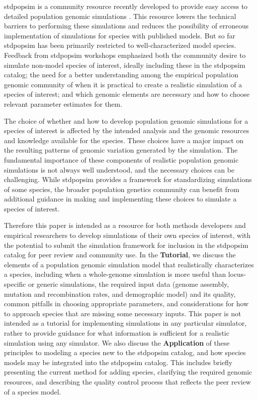 \documentclass[hidelinks]{article}
\begin{document}
stdpopsim is a community resource recently developed to provide easy
access to detailed population genomic simulations \citep{Adrion2020}. This
resource lowers the technical barriers to performing these simulations
and reduces the possibility of erroneous implementation of simulations
for species with published models. But so far stdpopsim has been
primarily restricted to well-characterized model species. Feedback from
stdpopsim workshops emphasized both the community desire to simulate
non-model species of interest, ideally including these in the stdpopsim catalog;
the need for a better understanding among the empirical population
genomic community of when it is practical to create a realistic
simulation of a species of interest; and which genomic elements are
necessary and how to choose relevant parameter estimates for them.

The choice of whether and how to develop population genomic
simulations for a species of interest is affected by the intended
analysis and the genomic resources and knowledge available for the
species. These choices have a major impact on the resulting patterns of
genomic variation generated by the simulation. The fundamental
importance of these components of realistic population genomic
simulations is not always well understood, and the necessary choices can
be challenging. While stdpopsim provides a framework for standardizing
simulations of some species, the broader population genetics community
can benefit from additional guidance in making and implementing these
choices to simulate a species of interest.

Therefore this paper is intended as a resource for both methods
developers and empirical researchers to develop simulations of their own
species of interest, with the potential to submit the simulation
framework for inclusion in the stdpopsim catalog for peer review and
community use. In the \textbf{Tutorial}, we discuss the elements of a
population genomic simulation model that realistically characterizes a
species, including when a whole-genome simulation is more useful than
locus-specific or generic simulations, the required input data (genome
assembly, mutation and recombination rates, and demographic model) and
its quality, common pitfalls in choosing appropriate parameters, and
considerations for how to approach species that are missing some
necessary inputs. This paper is not intended as a tutorial for
implementing simulations in any particular simulator, rather to provide
guidance for what information is sufficient for a realistic simulation
using any simulator. We also discuss the \textbf{Application} of these
principles to modeling a species new to the stdpopsim catalog, and how
species models may be integrated into the stdpopsim catalog. This includes
briefly presenting the current method for adding species, clarifying the
required genomic resources, and describing the quality control process
that reflects the peer review of a species model.
\end{document}
